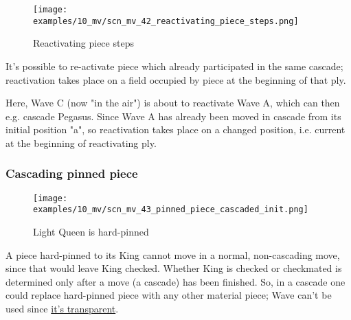 \clearpage %

\vspace*{-2.1\baselineskip}
\noindent
\begin{figure}[!h]
\texttt{[image: examples/10\_mv/scn\_mv\_42\_reactivating\_piece\_steps.png]}
\vspace*{-1.3\baselineskip}
\caption{Reactivating piece steps}
\label{fig:scn_mv_42_reactivating_piece_steps}
\end{figure}

\vspace*{-0.3\baselineskip}
It's possible to re-activate piece which already participated in the same cascade;
reactivation takes place on a field occupied by piece at the beginning of that ply.

Here, Wave C (now "in the air") is about to reactivate Wave A, which can then e.g.
cascade Pegasus. Since Wave A has already been moved in cascade from its initial
position "a", so reactivation takes place on a changed position, i.e. current at
the beginning of reactivating ply.

\clearpage %

\subsubsection*{Cascading pinned piece}
\label{sec:Miranda's veil/Wave/Cascading Waves/Cascading pinned piece}

\vspace*{-1.5\baselineskip}
\noindent
\begin{figure}[!h]
\texttt{[image: examples/10\_mv/scn\_mv\_43\_pinned\_piece\_cascaded\_init.png]}
\vspace*{-1.3\baselineskip}
\caption{Light Queen is hard-pinned}
\label{fig:scn_mv_43_pinned_piece_cascaded_init}
\end{figure}

\vspace*{-0.5\baselineskip}
A piece hard-pinned to its King cannot move in a normal, non-cascading move, since
that would leave King checked. Whether King is checked or checkmated is determined
only after a move (a cascade) has been finished. So, in a cascade one could replace
hard-pinned piece with any other material piece; Wave can't be used since
\hyperref[fig:scn_mv_07_wave_is_transparent]{it's transparent}.

